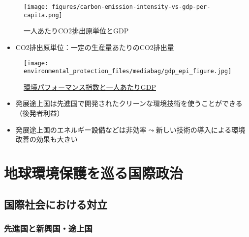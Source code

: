 \documentclass[
  xelatex,
  ja=standard]{bxjsarticle}
\providecommand{\tightlist}{%
  \setlength{\itemsep}{0pt}\setlength{\parskip}{0pt}}\usepackage{longtable,booktabs,array}
\begin{document}
\begin{figure}[htpb]

{\centering \texttt{[image: figures/carbon-emission-intensity-vs-gdp-per-capita.png]}

}

\caption{一人あたりCO2排出原単位とGDP}

\end{figure}

\begin{itemize}
\tightlist
\item
  CO2排出原単位：一定の生産量あたりのCO2排出量
\end{itemize}

\begin{figure}[htpb]

{\centering \texttt{[image: environmental\_protection\_files/mediabag/gdp\_epi\_figure.jpg]}

}

\caption{\href{https://epi.yale.edu/}{環境パフォーマンス指数と一人あたりGDP}}

\end{figure}

\begin{itemize}
\tightlist
\item
  発展途上国は先進国で開発されたクリーンな環境技術を使うことができる（後発者利益）
\item
  発展途上国のエネルギー設備などは非効率\(\leadsto\)新しい技術の導入による環境改善の効果も大きい
\end{itemize}

\hypertarget{ux5730ux7403ux74b0ux5883ux4fddux8b77ux3092ux5de1ux308bux56fdux969bux653fux6cbb}{%
\section{地球環境保護を巡る国際政治}\label{ux5730ux7403ux74b0ux5883ux4fddux8b77ux3092ux5de1ux308bux56fdux969bux653fux6cbb}}

\hypertarget{ux56fdux969bux793eux4f1aux306bux304aux3051ux308bux5bfeux7acb}{%
\subsection{国際社会における対立}\label{ux56fdux969bux793eux4f1aux306bux304aux3051ux308bux5bfeux7acb}}

\hypertarget{ux5148ux9032ux56fdux3068ux65b0ux8208ux56fdux9014ux4e0aux56fd}{%
\subsubsection{先進国と新興国・途上国}\label{ux5148ux9032ux56fdux3068ux65b0ux8208ux56fdux9014ux4e0aux56fd}}
\end{document}
